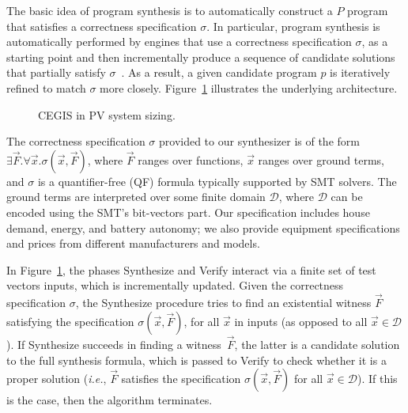 \documentclass[10pt,journal,compsoc]{IEEEtran}
\begin{document}
The basic idea of program synthesis is to automatically construct a $P$ program that satisfies a correctness specification $\sigma$. In particular, program synthesis is automatically performed by engines that use a correctness specification $\sigma$, as a starting point and then incrementally produce a sequence of candidate solutions that partially satisfy $\sigma$~\cite{Abateetal2017}. As a result, a given candidate program $p$ is iteratively refined to match $\sigma$ more closely. Figure~\ref{Counter-Example-Guided-Inductive-Synthesis} illustrates the underlying architecture. 
%
\begin{figure}[h]
\begin{center}
\end{center}
	\caption{CEGIS in PV system sizing.}
	\label{Counter-Example-Guided-Inductive-Synthesis}
\end{figure}

The correctness specification $\sigma$ provided to our synthesizer is of the form $\exists \vec{F}. \forall \vec{x}. \sigma(\vec{x}, \vec{F})$, where $\vec{F}$ ranges over functions, $\vec{x}$ ranges over ground terms, and $\sigma$ is a quantifier-free (QF) formula typically supported by SMT solvers. The ground terms are interpreted over some finite domain $\mathcal{D}$, where $\mathcal{D}$ can be encoded using the SMT's bit-vectors part. Our specification includes house demand, energy, and battery autonomy; we also provide equipment specifications and prices from different manufacturers and models.

In Figure~\ref{Counter-Example-Guided-Inductive-Synthesis}, the phases {\sc Synthesize} and {\sc Verify} interact via a finite set of test vectors {\sc inputs}, which is incrementally updated. Given the correctness specification $\sigma$, the {\sc Synthesize} procedure tries to find an existential witness $\vec{F}$ satisfying the specification $\sigma(\vec{x}, \vec{F})$, for all $\vec{x}$ in {\sc inputs} (as opposed to all $\vec{x} \in \mathcal{D}$). If {\sc Synthesize} succeeds in finding a witness~$\vec{F}$, the latter is a candidate solution to the full synthesis formula, which is passed to {\sc Verify} to check whether it is a proper solution ({\it i.e.}, $\vec{F}$ satisfies the specification $\sigma(\vec{x}, \vec{F})$ for all $\vec{x}\in\mathcal{D}$). If this is the case, then the algorithm terminates.
\end{document}
